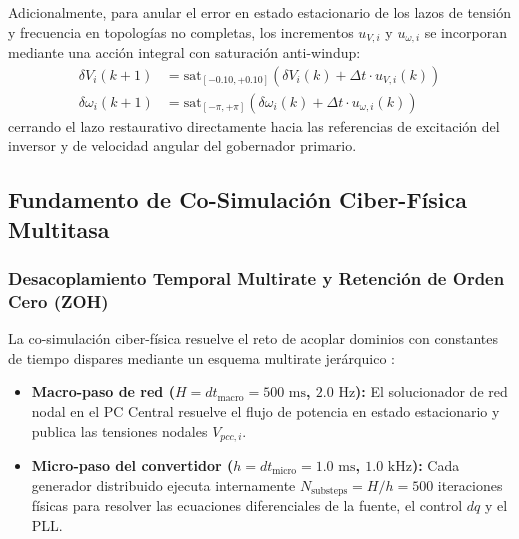 Adicionalmente, para anular el error en estado estacionario de los lazos de tensión y frecuencia en topologías no completas, los incrementos $u_{V,i}$ y $u_{\omega,i}$ se incorporan mediante una acción integral con saturación anti-windup:
\begin{align*}
\delta V_i(k+1) &= \text{sat}_{[-0.10, +0.10]} \left(\delta V_i(k) + \Delta t \cdot u_{V,i}(k) \right)  \\
\delta \omega_i(k+1) &= \text{sat}_{[-\pi, +\pi]} \left(\delta \omega_i(k) + \Delta t \cdot u_{\omega,i}(k) \right) 
\end{align*}
cerrando el lazo restaurativo directamente hacia las referencias de excitación del inversor y de velocidad angular del gobernador primario.


\subsection{Fundamento de Co-Simulación Ciber-Física Multitasa}

\subsubsection{Desacoplamiento Temporal Multirate y Retención de Orden Cero (ZOH)}
La co-simulación ciber-física resuelve el reto de acoplar dominios con constantes de tiempo dispares mediante un esquema multirate jerárquico \citep{Liu2025Multirate, Haid2022CosimCorrector}:
\begin{itemize}
    \item \textbf{Macro-paso de red ($H = dt_{\text{macro}} = 500\text{ ms}$, $2.0\text{ Hz}$):} El solucionador de red nodal en el PC Central resuelve el flujo de potencia en estado estacionario y publica las tensiones nodales $V_{pcc, i}$.
    \item \textbf{Micro-paso del convertidor ($h = dt_{\text{micro}} = 1.0\text{ ms}$, $1.0\text{ kHz}$):} Cada generador distribuido ejecuta internamente $N_{\text{substeps}} = H / h = 500$ iteraciones físicas para resolver las ecuaciones diferenciales de la fuente, el control $dq$ y el PLL.
\end{itemize}

